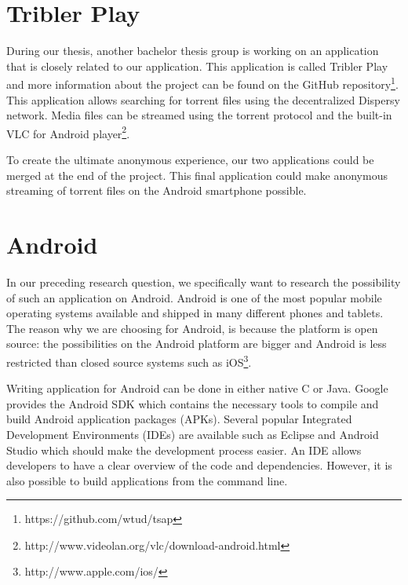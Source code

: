 	\section{Tribler Play}
		During our thesis, another bachelor thesis group is working on an application that is closely related to our application. This application is called Tribler Play and more information about the project can be found on the GitHub repository\footnote{https://github.com/wtud/tsap}. This application allows searching for torrent files using the decentralized Dispersy network. Media files can be streamed using the torrent protocol and the built-in VLC for Android player\footnote{http://www.videolan.org/vlc/download-android.html}.
		
		To create the ultimate anonymous experience, our two applications could be merged at the end of the project. This final application could make anonymous streaming of torrent files on the Android smartphone possible.
		
	\section{Android}
		In our preceding research question, we specifically want to research the possibility of such an application on Android. Android is one of the most popular mobile operating systems available and shipped in many different phones and tablets. The reason why we are choosing for Android, is because the platform is open source: the possibilities on the Android platform are bigger and Android is less restricted than closed source systems such as iOS\footnote{http://www.apple.com/ios/}.
		
		Writing application for Android can be done in either native C or Java. Google provides the Android SDK which contains the necessary tools to compile and build Android application packages (APKs). Several popular Integrated Development Environments (IDEs) are available such as Eclipse and Android Studio which should make the development process easier. An IDE allows developers to have a clear overview of the code and dependencies. However, it is also possible to build applications from the command line.